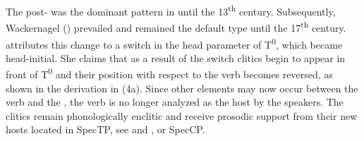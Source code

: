 \documentclass[output=paper,modfonts,newtxmath,hidelinks]{langscibook}
\begin{document}
The post-  was the dominant pattern in  until the 13\textsuperscript{th} century. Subsequently, Wackernagel ()  prevailed and remained the default type until the 17\textsuperscript{th} century. \citeauthor{pancheva2005} attributes this change to a switch in the head parameter of T\textsuperscript{0}, which became head-initial. She claims that as a result of the switch  clitics begin to appear in front of T\textsuperscript{0} and their position with respect to the verb becomes reversed, as shown in the derivation in (4a). Since other elements may now occur between the verb and the , the verb is no longer analyzed as the  host by the speakers. The clitics remain phonologically enclitic and receive prosodic support from their new hosts located in SpecTP, see  and , or SpecCP.
\end{document}
